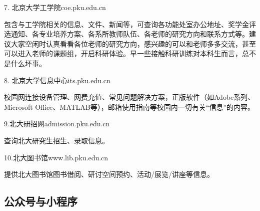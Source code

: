 \documentclass[11pt,oneside]{book}
\begin{document}
\vspace{10pt}

7. 北京大学工学院\quad coe.pku.edu.cn

包含与工学院相关的信息、文件、新闻等，可查询各功能处室办公地址、奖学金评选通知、各专业培养方案、各系所教师队伍、各老师的研究方向和联系方式等。建议大家空闲时认真看看各位老师的研究方向，感兴趣的可以和老师多多交流，甚至可以进入老师的课题组，开启科研体验。早一些接触科研训练对本科生而言，总不是什么坏事。

\vspace{10pt}

8. 北京大学信息中心\quad its.pku.edu.cn

校园网连接设备管理、网费充值、常见问题解决方案，正版软件（如Adobe系列、Microsoft Office、MATLAB等），邮箱使用指南等校园内一切有关“信息”的内容。

\vspace{10pt}

9.北大研招网\quad admission.pku.edu.cn

查询北大研究生招生、录取信息。

\vspace{10pt}

10.北大图书馆\quad www.lib.pku.edu.cn

提供北大图书馆图书借阅、研讨空间预约、活动/展览/讲座等信息。
	
\newpage

\subsection{公众号与小程序}
\end{document}
